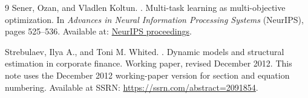 \documentclass[11pt]{article}
\newcommand{\1}{\mathbf{1}}
\begin{document}
\begin{thebibliography}{9}
Sener, Ozan, and Vladlen Koltun.
.
\newblock Multi-task learning as multi-objective optimization.
\newblock In \emph{Advances in Neural Information Processing Systems}
(NeurIPS), pages 525--536.
\newblock Available at:
\href{https://proceedings.neurips.cc/paper/2018/hash/432aca3a1e345e339f35a30c8f65edce-Abstract.html}{NeurIPS proceedings}.

Strebulaev, Ilya A., and Toni M. Whited.
.
\newblock Dynamic models and structural estimation in corporate finance.
\newblock Working paper, revised December 2012. This note uses the December
2012 working-paper version for section and equation numbering.
\newblock Available at SSRN:
\href{https://ssrn.com/abstract=2091854}{https://ssrn.com/abstract=2091854}.

\end{thebibliography}
\end{document}
